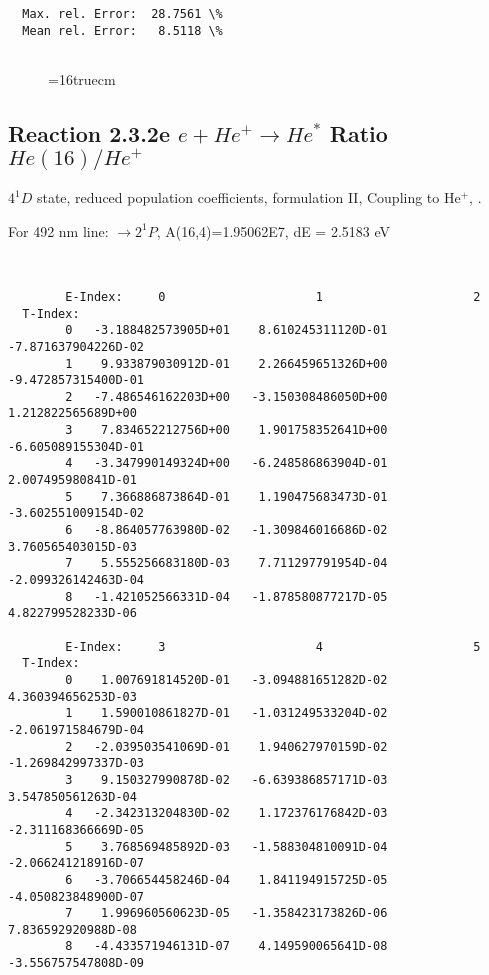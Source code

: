 \documentclass[12pt,dvipdfmx]{article}
\begin{document}
{\begin{small}
\begin{verbatim}
  Max. rel. Error:  28.7561 \%
  Mean rel. Error:   8.5118 \%


\end{verbatim}\end{small}
\begin{figure} \label{2.3.2d}
\epsfxsize=16truecm
\end{figure}
\newpage


\subsection{
  Reaction 2.3.2e $e + He^+ \rightarrow He^*  $ Ratio $He(16)/He^+$
}

  $4^1D$ state,
  reduced population coefficients, formulation II,
  Coupling to He$^+$, \cite{kn:Fujimoto}.

  For 492 nm line: $\rightarrow 2^1P$, A(16,4)=1.95062E7, dE = 2.5183 eV

\begin{small}\begin{verbatim}


        E-Index:     0                     1                     2
  T-Index:
        0   -3.188482573905D+01    8.610245311120D-01   -7.871637904226D-02
        1    9.933879030912D-01    2.266459651326D+00   -9.472857315400D-01
        2   -7.486546162203D+00   -3.150308486050D+00    1.212822565689D+00
        3    7.834652212756D+00    1.901758352641D+00   -6.605089155304D-01
        4   -3.347990149324D+00   -6.248586863904D-01    2.007495980841D-01
        5    7.366886873864D-01    1.190475683473D-01   -3.602551009154D-02
        6   -8.864057763980D-02   -1.309846016686D-02    3.760565403015D-03
        7    5.555256683180D-03    7.711297791954D-04   -2.099326142463D-04
        8   -1.421052566331D-04   -1.878580877217D-05    4.822799528233D-06

        E-Index:     3                     4                     5
  T-Index:
        0    1.007691814520D-01   -3.094881651282D-02    4.360394656253D-03
        1    1.590010861827D-01   -1.031249533204D-02   -2.061971584679D-04
        2   -2.039503541069D-01    1.940627970159D-02   -1.269842997337D-03
        3    9.150327990878D-02   -6.639386857171D-03    3.547850561263D-04
        4   -2.342313204830D-02    1.172376176842D-03   -2.311168366669D-05
        5    3.768569485892D-03   -1.588304810091D-04   -2.066241218916D-07
        6   -3.706654458246D-04    1.841194915725D-05   -4.050823848900D-07
        7    1.996960560623D-05   -1.358423173826D-06    7.836592920988D-08
        8   -4.433571946131D-07    4.149590065641D-08   -3.556757547808D-09


\end{verbatim}
\end{small}}
\end{document}
